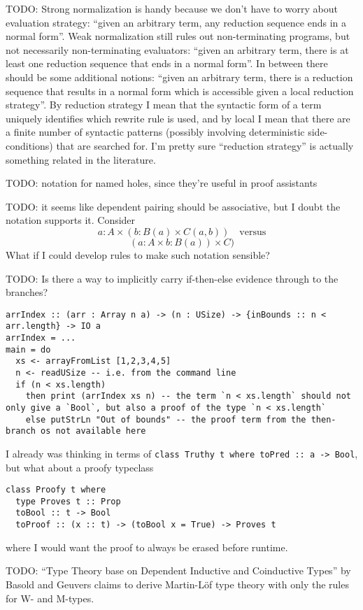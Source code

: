\documentclass[11pt]{article} %
\theoremstyle{definition}
\theoremstyle{remark}
\begin{document}
TODO:
Strong normalization is handy because we don't have to worry about evaluation strategy: ``given an arbitrary term, any reduction sequence ends in a normal form''.
Weak normalization still rules out non-terminating programs, but not necessarily non-terminating evaluators: ``given an arbitrary term, there is at least one reduction sequence that ends in a normal form''.
In between there should be some additional notions: ``given an arbitrary term, there is a reduction sequence that results in a normal form which is accessible given a local reduction strategy''.
By reduction strategy I mean that the syntactic form of a term uniquely identifies which rewrite rule is used, and by local I mean that there are a finite number of syntactic patterns (possibly involving deterministic side-conditions) that are searched for.
I'm pretty sure ``reduction strategy'' is actually something related in the literature.

TODO: notation for named holes, since they're useful in proof assistants




TODO: it seems like dependent pairing should be associative, but I doubt the notation supports it. Consider
  $$a : A \times (b : B(a) \times C(a,b))\quad\text{versus}$$
  $$(a : A \times b : B(a)) \times C)$$
What if I could develop rules to make such notation sensible?

TODO:
Is there a way to implicitly carry if-then-else evidence through to the branches?
\begin{verbatim}
arrIndex :: (arr : Array n a) -> (n : USize) -> {inBounds :: n < arr.length} -> IO a
arrIndex = ...
main = do
  xs <- arrayFromList [1,2,3,4,5]
  n <- readUSize -- i.e. from the command line
  if (n < xs.length)
    then print (arrIndex xs n) -- the term `n < xs.length` should not only give a `Bool`, but also a proof of the type `n < xs.length`
    else putStrLn "Out of bounds" -- the proof term from the then-branch os not available here
\end{verbatim}
I already was thinking in terms of \verb!class Truthy t where toPred :: a -> Bool!, but what about a proofy typeclass
\begin{verbatim}
class Proofy t where
  type Proves t :: Prop
  toBool :: t -> Bool
  toProof :: (x :: t) -> (toBool x = True) -> Proves t

\end{verbatim}
where I would want the proof to always be erased before runtime.

TODO:
``Type Theory base on Dependent Inductive and Coinductive Types'' by Basold and Geuvers claims to derive Martin-L\"of type theory with only the rules for W- and M-types.
\end{document}

